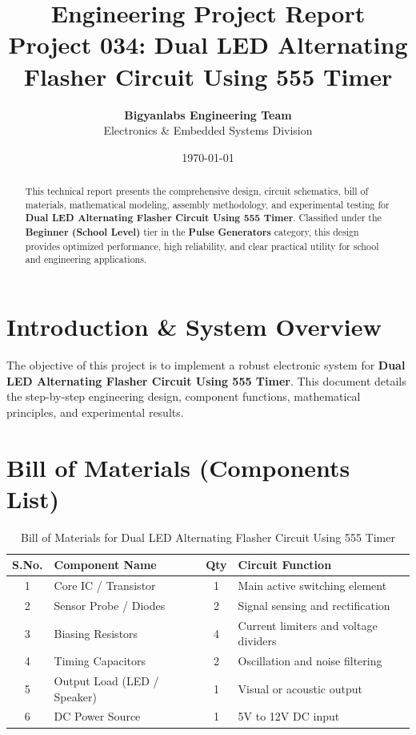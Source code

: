 \documentclass[11pt,a4paper]{article}
\title{\textbf{\Huge Engineering Project Report}\\[0.5em] \Large Project 034: Dual LED Alternating Flasher Circuit Using 555 Timer}
\author{\textbf{Bigyanlabs Engineering Team}\\ Electronics \& Embedded Systems Division}
\date{\today}
\begin{document}
\maketitle
\thispagestyle{empty}

\begin{abstract}
This technical report presents the comprehensive design, circuit schematics, bill of materials, mathematical modeling, assembly methodology, and experimental testing for \textbf{Dual LED Alternating Flasher Circuit Using 555 Timer}. Classified under the \textbf{Beginner (School Level)} tier in the \textbf{Pulse Generators} category, this design provides optimized performance, high reliability, and clear practical utility for school and engineering applications.
\end{abstract}

\newpage
\tableofcontents
\newpage

\section{Introduction \& System Overview}
The objective of this project is to implement a robust electronic system for \textbf{Dual LED Alternating Flasher Circuit Using 555 Timer}. This document details the step-by-step engineering design, component functions, mathematical principles, and experimental results.

\section{Bill of Materials (Components List)}
\begin{table}[h!]
\centering
\caption{Bill of Materials for Dual LED Alternating Flasher Circuit Using 555 Timer}
\vspace{0.5em}
\begin{tabular}{clcp{7cm}}
\toprule
\textbf{S.No.} & \textbf{Component Name} & \textbf{Qty} & \textbf{Circuit Function} \\
\midrule
1 & Core IC / Transistor & 1 & Main active switching element \\
2 & Sensor Probe / Diodes & 2 & Signal sensing and rectification \\
3 & Biasing Resistors & 4 & Current limiters and voltage dividers \\
4 & Timing Capacitors & 2 & Oscillation and noise filtering \\
5 & Output Load (LED / Speaker) & 1 & Visual or acoustic output \\
6 & DC Power Source & 1 & 5V to 12V DC input \\
\bottomrule
\end{tabular}
\end{table}
\end{document}

